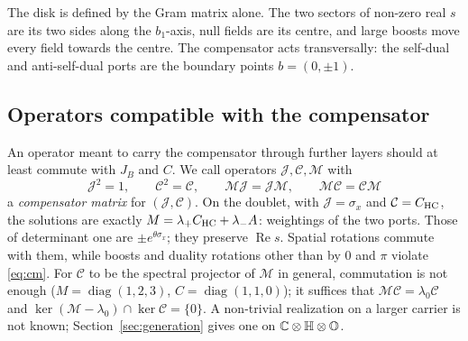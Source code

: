 The disk is defined by the Gram matrix alone.  The two sectors of non-zero real \(s\) are its two sides along the \(b_1\)-axis, null fields are its
centre, and large boosts move every field towards the centre.  The compensator acts transversally: the self-dual and anti-self-dual ports are
the boundary points \(b=(0,\pm1)\).

\subsection{Operators compatible with the compensator}

An operator meant to carry the compensator through further layers should at least commute with \(J_B\) and \(C\).  We call operators
\(\mathcal J,\mathcal C,\mathcal M\) with
\begin{equation}\label{eq:cm}
\mathcal J^2=1,\qquad \mathcal C^2=\mathcal C,\qquad \mathcal M\mathcal J=\mathcal J\mathcal M,\qquad \mathcal M\mathcal C=\mathcal C\mathcal M
\end{equation}
a \emph{compensator matrix} for \((\mathcal J,\mathcal C)\).  On the doublet, with \(\mathcal J=\sigma_x\) and \(\mathcal C=C_{\rm HC}\), the solutions are
exactly \(M=\lambda_+C_{\rm HC}+\lambda_-A\): weightings of the two ports.  Those of determinant one are \(\pm e^{\theta\sigma_x}\); they preserve
\(\operatorname{Re}s\).  Spatial rotations commute with them, while boosts and duality rotations other than by \(0\) and \(\pi\) violate
\eqref{eq:cm}.  For \(\mathcal C\) to be the spectral projector of \(\mathcal M\) in general, commutation is not enough
(\(M=\operatorname{diag}(1,2,3)\), \(C=\operatorname{diag}(1,1,0)\)); it suffices that \(\mathcal M\mathcal C=\lambda_0\mathcal C\) and
\(\ker(\mathcal M-\lambda_0)\cap\ker\mathcal C=\{0\}\).  A non-trivial realization on a larger carrier is not known; Section~\ref{sec:generation}
gives one on \(\mathbb C\otimes\mathbb H\otimes\mathbb O\).
